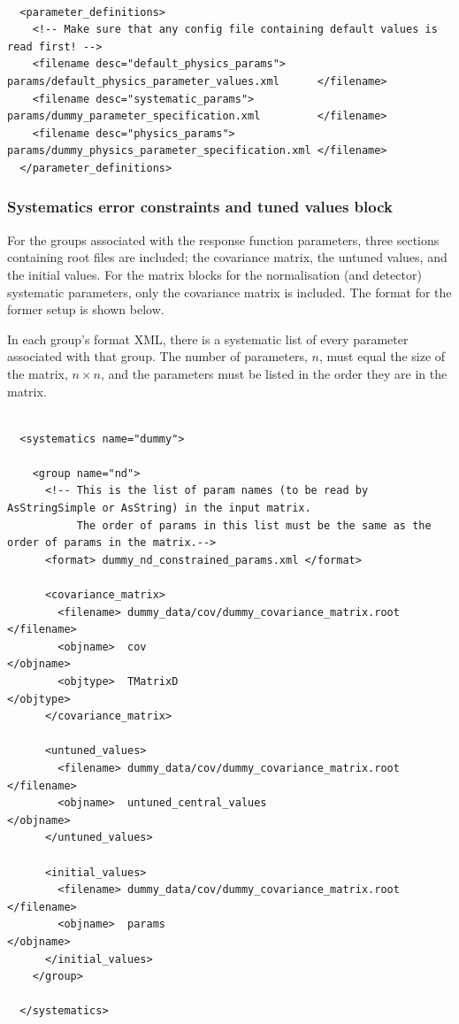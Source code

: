 {\color{capri}
\begin{verbatim}

  <parameter_definitions>
    <!-- Make sure that any config file containing default values is read first! -->
    <filename desc="default_physics_params"> params/default_physics_parameter_values.xml      </filename>
    <filename desc="systematic_params">      params/dummy_parameter_specification.xml         </filename>
    <filename desc="physics_params">         params/dummy_physics_parameter_specification.xml </filename>
  </parameter_definitions>

\end{verbatim}
}

\subsubsection{Systematics error constraints and tuned values block}

For the groups associated with the response function parameters, three sections containing root files are included; the covariance matrix, the untuned values, and the initial values. For the matrix blocks for the normalisation (and detector) systematic parameters, only the covariance matrix is included. The format for the former setup is shown below.

In each group's format XML, there is a systematic list of every parameter associated with that group. The number of parameters, $n$, must equal the size of the matrix, $n \times n$, and the parameters must be listed in the order they are in the matrix.

{\color{capri}
\begin{verbatim}

  <systematics name="dummy">

    <group name="nd">
      <!-- This is the list of param names (to be read by AsStringSimple or AsString) in the input matrix.
           The order of params in this list must be the same as the order of params in the matrix.-->
      <format> dummy_nd_constrained_params.xml </format>
      
      <covariance_matrix>
        <filename> dummy_data/cov/dummy_covariance_matrix.root </filename>
        <objname>  cov                                         </objname>
        <objtype>  TMatrixD                                    </objtype>
      </covariance_matrix>

      <untuned_values>
        <filename> dummy_data/cov/dummy_covariance_matrix.root </filename>
        <objname>  untuned_central_values                      </objname>
      </untuned_values>

      <initial_values>
        <filename> dummy_data/cov/dummy_covariance_matrix.root </filename>
        <objname>  params                                      </objname>
      </initial_values>
    </group>

  </systematics>

\end{verbatim}
}


